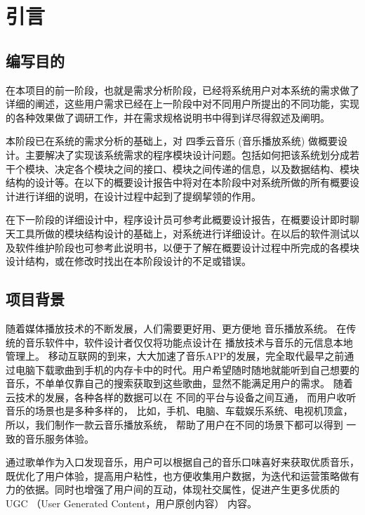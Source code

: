 
\chapter{引言}
\section{编写目的}
在本项目的前一阶段，也就是需求分析阶段，已经将系统用户对本系统的需求做了详细的阐述，这些用户需求已经在上一阶段中对不同用户所提出的不同功能，实现的各种效果做了调研工作，并在需求规格说明书中得到详尽得叙述及阐明。

本阶段已在系统的需求分析的基础上，对
四季云音乐 (音乐播放系统)
做概要设计。主要解决了实现该系统需求的程序模块设计问题。包括如何把该系统划分成若干个模块、决定各个模块之间的接口、模块之间传递的信息，以及数据结构、模块结构的设计等。在以下的概要设计报告中将对在本阶段中对系统所做的所有概要设计进行详细的说明，在设计过程中起到了提纲挈领的作用。

在下一阶段的详细设计中，程序设计员可参考此概要设计报告，在概要设计即时聊天工具所做的模块结构设计的基础上，对系统进行详细设计。在以后的软件测试以及软件维护阶段也可参考此说明书，以便于了解在概要设计过程中所完成的各模块设计结构，或在修改时找出在本阶段设计的不足或错误。



\section{项目背景}
随着媒体播放技术的不断发展，人们需要更好用、更方便地
音乐播放系统。
在传统的音乐软件中，软件设计者仅仅将功能点设计在
播放技术与音乐的元信息本地管理上。
移动互联网的到来，大大加速了音乐APP的发展，完全取代最早之前通过电脑下载歌曲到手机的内存卡中的时代。用户希望随时随地就能听到自己想要的音乐，不单单仅靠自己的搜索获取到这些歌曲，显然不能满足用户的需求。
随着云技术的发展，各种各样的数据可以在
不同的平台与设备之间互通，
而用户收听音乐的场景也是多种多样的，
比如，手机、电脑、车载娱乐系统、电视机顶盒，
所以，我们制作一款云音乐播放系统，
帮助了用户在不同的场景下都可以得到
一致的音乐服务体验。

通过歌单作为入口发现音乐，用户可以根据自己的音乐口味喜好来获取优质音乐，既优化了用户体验，提高用户粘性，也方便收集用户数据，为迭代和运营策略做有力的依据。同时也增强了用户间的互动，体现社交属性，促进产生更多优质的UGC
（User Generated Content，用户原创内容）
内容。

